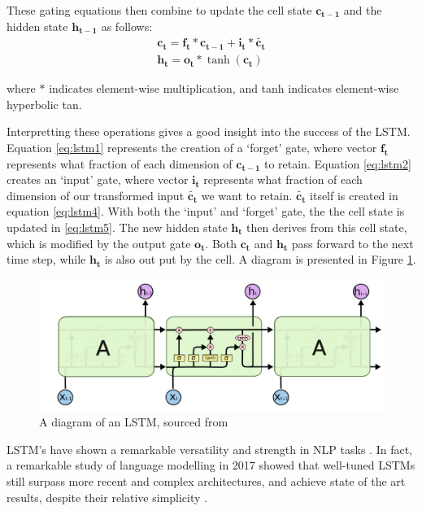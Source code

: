 These gating equations then combine to update the cell state $\mathbf{c_{t-1}}$ and the hidden state $\mathbf{h_{t-1}}$ as follows: 
\begin{align}
    \mathbf{c_t} = \mathbf{f_t} * \mathbf{c_{t-1}} + \mathbf{i_t} * \mathbf{\tilde{c_t}} \label{eq:lstm5}\\
    \mathbf{h_t} = \mathbf{o_t} * \tanh(\mathbf{c_t}) \label{eq:lstm6}
\end{align}

where  $*$ indicates element-wise multiplication, and tanh indicates element-wise hyperbolic tan.

Interpretting these operations gives a good insight into the success of the LSTM.  
Equation \ref{eq:lstm1} represents the creation of a `forget' gate, where vector $\mathbf{f_t}$ represents what fraction of each dimension of $\mathbf{c_{t-1}}$ to retain. 
Equation \ref{eq:lstm2}  creates an `input' gate, where vector $\mathbf{i_t}$ represents what fraction of each dimension of our transformed input $\mathbf{\tilde{c_{t}}}$ we want to retain.  
$\mathbf{\tilde{c_{t}}}$ itself is created in equation \ref{eq:lstm4}. With both the `input' and `forget' gate, the  the cell state is updated in \ref{eq:lstm5}. 
The new hidden state $\mathbf{h_{t}}$ then derives from this cell state, which is modified by the output gate $\mathbf{o_t}$. 
Both $\mathbf{c_{t}}$ and $\mathbf{h_{t}}$ pass forward to the next time step, while $\mathbf{h_{t}}$ is also out put by the cell. 
A diagram is presented in Figure \ref{fig:lstm_colah}.

\begin{figure}[tb]
    \centering
    \includegraphics[width=\linewidth]{ModelPics/LSTMcolah.png}
    \caption{A diagram of an LSTM, sourced from \cite{noauthor_understanding_nodate}}
    \label{fig:lstm_colah}{}
\end{figure}

LSTM's have shown a remarkable versatility and strength in NLP tasks \citep{young_recent_2017}. In fact, a remarkable study of language modelling in 2017 showed that well-tuned LSTMs still surpass more recent and complex architectures, and achieve state of the art results, despite their relative simplicity \citep{melis_state_2017}.

